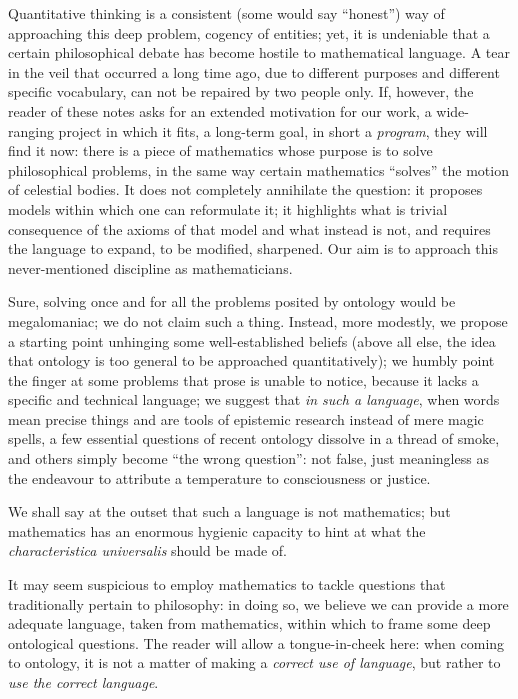 Quantitative thinking is a consistent (some would say ``honest'') way of approaching this deep problem, cogency of entities; yet, it is undeniable that a certain philosophical debate has become hostile to mathematical language. A tear in the veil that occurred a long time ago, due to different purposes and different specific vocabulary, can not be repaired by two people only. If, however, the reader of these notes asks for an extended motivation for our work, a wide-ranging project in which it fits, a long-term goal, in short a \emph{program}, they will find it now: there is a piece of mathematics whose purpose is to solve philosophical problems, in the same way certain mathematics ``solves'' the motion of celestial bodies. It does not completely annihilate the question: it proposes models within which one can reformulate it; it highlights what is trivial consequence of the axioms of that model and what instead is not, and requires the language to expand, to be modified, sharpened. Our aim is to approach this never-mentioned discipline as mathematicians. %

Sure, solving once and for all the problems posited by ontology would be megalomaniac; we do not claim such a thing. Instead, more modestly, we propose a starting point unhinging some well-established beliefs (above all else, the idea that ontology is too general to be approached quantitatively); we humbly point the finger at some problems that prose is unable to notice, because it lacks a specific and technical language; we suggest that \emph{in such a language}, when words mean precise things and are tools of epistemic research instead of mere magic spells, a few essential questions of recent ontology dissolve in a thread of smoke, and others simply become ``the wrong question'': not false, just meaningless as the endeavour to attribute a temperature to consciousness or justice.

We shall say at the outset that such a language is not mathematics; but mathematics has an enormous hygienic capacity to hint at what the \emph{characteristica universalis} should be made of.

It may seem suspicious to employ mathematics to tackle questions that traditionally pertain to philosophy: in doing so, we believe we can provide a more adequate language, taken from mathematics, within which to frame some deep ontological questions. The reader will allow a tongue-in-cheek here: when coming to ontology, it is not a matter of making a \emph{correct use of language}, but rather to \emph{use the correct language}.

